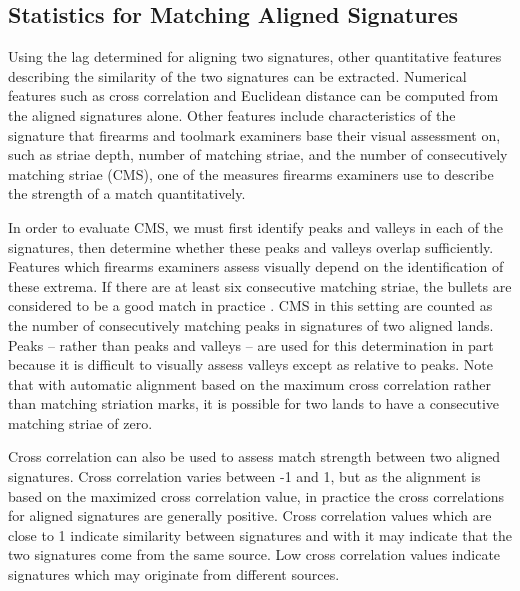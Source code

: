 \documentclass[doubleblind]{elsarticle}\usepackage[]{graphicx}\usepackage[]{color}
\begin{document}
\subsection{Statistics for Matching Aligned Signatures}

Using the lag determined for aligning two signatures, other quantitative features describing the similarity of the two signatures can be extracted. Numerical features such as cross correlation and Euclidean distance
can be computed from the aligned signatures alone. Other features include characteristics of the signature that firearms and toolmark examiners base their visual assessment on, such as striae depth, number of matching striae, and the number of consecutively matching striae (CMS), one of the measures firearms examiners use to describe the strength of a match quantitatively.

In order to evaluate CMS, we must first identify peaks and valleys in each of the signatures, then determine whether these peaks and valleys overlap sufficiently. Features which firearms examiners assess visually depend on the identification of these extrema. If there are at least six consecutive matching striae, the bullets are considered to be a good match in practice \citep{biasotti_firearms_1997,nichols_scientific_2006}. CMS in this setting are counted as the number of consecutively matching peaks in signatures of two aligned lands. Peaks -- rather than peaks and valleys -- are used for this determination in part because it is difficult to visually assess valleys except as relative to peaks. Note that with automatic alignment based on the maximum cross correlation rather than matching striation marks, it is possible for two lands to have a consecutive matching striae of zero. 


Cross correlation can also be used to assess match strength between two aligned signatures. Cross correlation varies between -1 and 1, but as the alignment is based on the maximized cross correlation value, in practice the cross correlations for aligned signatures are generally positive. Cross correlation values which are close to 1 indicate similarity between signatures and with it may indicate that the two signatures come from the same source. Low cross correlation values indicate signatures which may originate from different sources.
\end{document}
